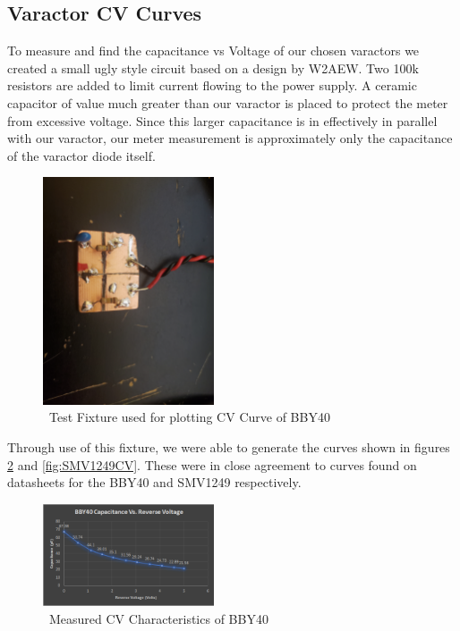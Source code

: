 \documentclass[journal]{IEEEtran} \usepackage[english]{babel}
\begin{document}
\subsection{Varactor CV Curves}\label{subsec:CVCurves}

To measure and find the capacitance vs Voltage of our chosen varactors we
created a small ugly style circuit based on a design by W2AEW. Two 100k
resistors are added to limit current flowing to the power supply. A ceramic
capacitor of value much greater than our varactor is placed to protect the meter
from excessive voltage. Since this larger capacitance is in effectively in
parallel with our varactor, our meter measurement is approximately only the
capacitance of the varactor diode itself.

\begin{figure}[htb]
\centering
\includegraphics[width=0.45\textwidth]{BBY40_capacitance_testfixture}
\caption{\ Test Fixture used for plotting CV Curve of BBY40
}\label{fig:CVTestFixt}
\end{figure}



Through use of this fixture, we were able to generate the curves shown in
figures \ref{fig:BBY40CV} and \ref{fig:SMV1249CV}. These were in close agreement
to curves found on datasheets for the BBY40 and SMV1249 respectively.
 
\begin{figure}[htb]
\centering
\includegraphics[width=0.45\textwidth]{bbY40CV}
\caption{\ Measured CV Characteristics of BBY40 
}\label{fig:BBY40CV}
\end{figure}
 
\end{document}
